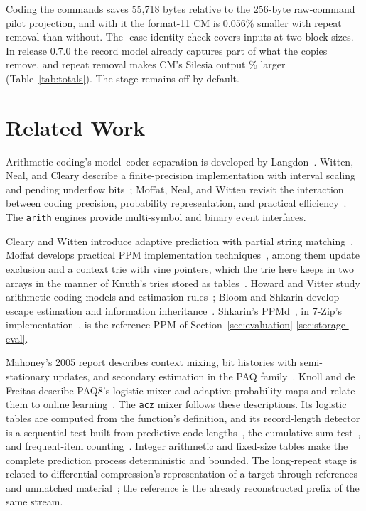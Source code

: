 \documentclass[10pt,letterpaper]{article}
\newcommand{\acz}{\texttt{acz}}
\newcommand{\arith}{\texttt{arith}}
\begin{document}
Coding the commands saves 55,718 bytes relative to the 256-byte raw-command pilot projection, and with it the format-11 CM is 0.056\% smaller with repeat removal than without. The \CommandIdentityCases{}-case identity check covers \CommandIdentityInputs{} inputs at two block sizes. In release 0.7.0 the record model already captures part of what the copies remove, and repeat removal makes CM's Silesia output \DedupLarger\% larger (Table~\ref{tab:totals}). The stage remains off by default.

\FloatBarrier
\section{Related Work}
Arithmetic coding's model--coder separation is developed by Langdon~\cite{langdon}. Witten, Neal, and Cleary describe a finite-precision implementation with interval scaling and pending underflow bits~\cite{witten}; Moffat, Neal, and Witten revisit the interaction between coding precision, probability representation, and practical efficiency~\cite{moffat}. The \arith{} engines provide multi-symbol and binary event interfaces.

Cleary and Witten introduce adaptive prediction with partial string matching~\cite{cleary}. Moffat develops practical PPM implementation techniques~\cite{moffatppm}, among them update exclusion and a context trie with vine pointers, which the trie here keeps in two arrays in the manner of Knuth's tries stored as tables~\cite{knuth3}. Howard and Vitter study arithmetic-coding models and estimation rules~\cite{howard}; Bloom and Shkarin develop escape estimation and information inheritance~\cite{bloom,shkarin}. Shkarin's PPMd~\cite{shkarin}, in 7-Zip's implementation~\cite{ppmd}, is the reference PPM of Section~\ref{sec:evaluation}-\ref{sec:storage-eval}.

Mahoney's 2005 report describes context mixing, bit histories with semi-stationary updates, and secondary estimation in the PAQ family~\cite{mahoney}. Knoll and de Freitas describe PAQ8's logistic mixer and adaptive probability maps and relate them to online learning~\cite{knoll}. The \acz{} mixer follows these descriptions. Its logistic tables are computed from the function's definition, and its record-length detector is a sequential test built from predictive code lengths~\cite{rissanen}, the cumulative-sum test~\cite{page}, and frequent-item counting~\cite{misragries}. Integer arithmetic and fixed-size tables make the complete prediction process deterministic and bounded. The long-repeat stage is related to differential compression's representation of a target through references and unmatched material~\cite{ajtai}; the reference is the already reconstructed prefix of the same stream.
\end{document}
